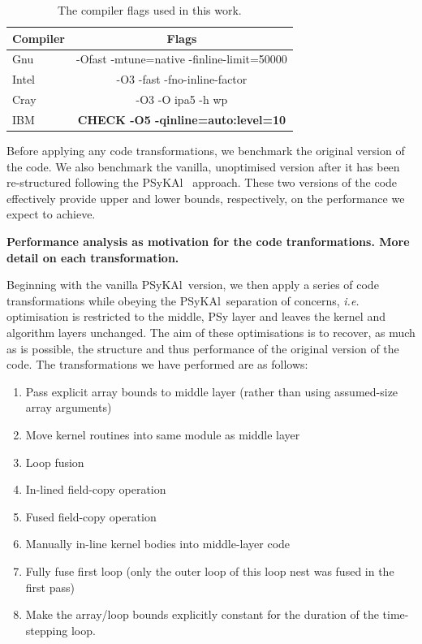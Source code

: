 \documentclass[journal]{IEEEtran}
\newcommand{\psykal}{{PS}y{KA}l\ }
\begin{document}
\begin{table}[!t]
\renewcommand{\arraystretch}{1.3}
\caption{The compiler flags used in this work.}
\label{TABLE_compiler_flags}
\centering
\begin{tabular}{l|c}
\hline
Compiler  &  Flags \\
\hline
Gnu       & -Ofast -mtune=native -finline-limit=50000    \\
Intel     & -O3 -fast -fno-inline-factor    \\
Cray      & -O3 -O ipa5 -h wp               \\
IBM       & \bf{CHECK} -O5 -qinline=auto:level=10      \\
\hline
\end{tabular}
\end{table}

Before applying any code transformations, we benchmark the original
version of the code. We also benchmark the vanilla, unoptimised
version after it has been re-structured following the \psykal
approach. These two versions of the code effectively provide upper and
lower bounds, respectively, on the performance we expect to achieve.

{\bf Performance analysis as motivation for the code
  tranformations. More detail on each transformation.}

Beginning with the vanilla \psykal version, we then apply a series of
code transformations while obeying the \psykal separation of concerns,
{\it i.e.} optimisation is restricted to the middle, {PS}y layer and leaves
the kernel and algorithm layers unchanged. The aim of these
optimisations is to recover, as much as is possible, the structure and
thus performance of the original version of the code. The
transformations we have performed are as follows:
\begin{enumerate}

\item Pass explicit array bounds to middle layer (rather than using
  assumed-size array arguments)

\item Move kernel routines into same module as middle layer

\item Loop fusion

\item In-lined field-copy operation

\item Fused field-copy operation

\item Manually in-line kernel bodies into middle-layer code

\item Fully fuse first loop (only the outer loop of this loop nest was
  fused in the first pass)

\item Make the array/loop bounds explicitly constant for the
      duration of the time-stepping loop.
\end{enumerate}
\end{document}
